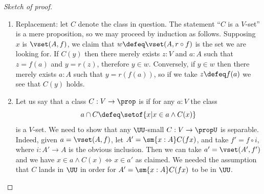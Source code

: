 \begin{proof}[Sketch of proof]
\begin{enumerate}
  \item Replacement: let $C$ denote the class in question.
    The statement ``$C$ is a $V$-set'' is a mere proposition, so we may
    proceed by induction as follows. Supposing $x$ is $\vset(A, f)$, we claim that $w
    \defeq \vset(A, r \circ f)$ is the set we are looking for.  If $C(y)$ then there merely exists
    $z : V$ and $a : A$ such that $z = f(a)$ and $y = r(z)$, therefore $y \in w$.
    Conversely, if $y \in w$ then there merely exists $a : A$ such that $y = r(f(a))$, so
    if we take $z \defeq f(a)$ we see that $C(y)$ holds.

  \item Let us say that a class $C: V\to\prop$ is 
    if for any $a:V$ the class
  \begin{equation*}
    a \cap C \defeq\setof{x | x\in a \wedge C(x)}
  \end{equation*}
  is a $V$-set.
We need to show that any $\UU$-small  $C: V \to \propU$ is separable. Indeed, given $a=\vset(A,f)$, let $A' = \sm{x:A}C(fx)$, and take $f' = f\circ i$, where $i : A' \to A$ is the obvious inclusion.  Then we can take $a' = \vset(A',f')$ and we have $x\in a\wedge C(x) \Leftrightarrow x\in a'$ as claimed.  We needed the assumption that $C$ lands in $\UU$ in order for $A' = \sm{x:A}C(fx)$ to be in $\UU$.\qedhere
\end{enumerate}
\end{proof}
